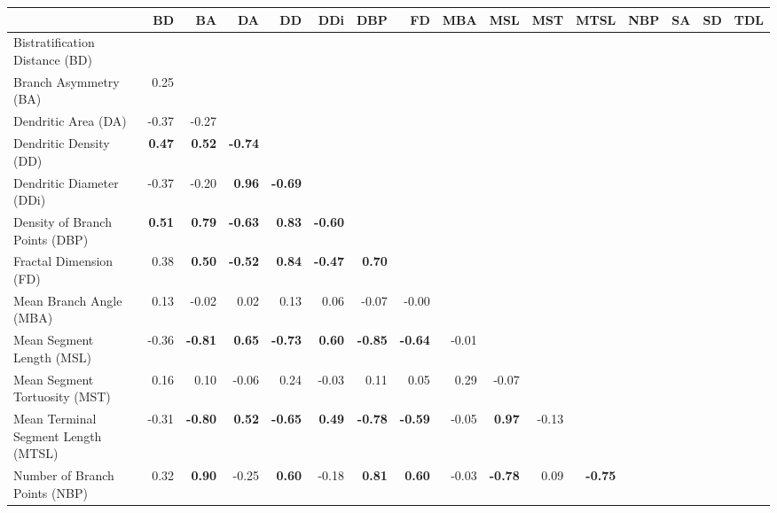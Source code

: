 \documentclass[11pt]{article}
\begin{document}
\clearpage




\begin{sidewaystable}
\begin{tabular}{lrrrrrrrrrrrrrrr}
\toprule
& BD& BA& DA& DD& DDi& DBP& FD& MBA& MSL& MST& MTSL& NBP& SA& SD& TDL\\
\midrule
Bistratification Distance (BD) & \textbf{}  &  &  &  &  &  &  &  &  &  &  &  &  &  & \\
Branch Asymmetry (BA) & 0.25 & \textbf{}  &  &  &  &  &  &  &  &  &  &  &  &  & \\
Dendritic Area (DA) & -0.37 & -0.27 & \textbf{}  &  &  &  &  &  &  &  &  &  &  &  & \\
Dendritic Density (DD) & \textbf{0.47} & \textbf{0.52} & \textbf{-0.74} & \textbf{}  &  &  &  &  &  &  &  &  &  &  & \\
Dendritic Diameter (DDi) & -0.37 & -0.20 & \textbf{0.96} & \textbf{-0.69} & \textbf{}  &  &  &  &  &  &  &  &  &  & \\
Density of Branch Points (DBP) & \textbf{0.51} & \textbf{0.79} & \textbf{-0.63} & \textbf{0.83} & \textbf{-0.60} & \textbf{}  &  &  &  &  &  &  &  &  & \\
Fractal Dimension (FD) & 0.38 & \textbf{0.50} & \textbf{-0.52} & \textbf{0.84} & \textbf{-0.47} & \textbf{0.70} & \textbf{}  &  &  &  &  &  &  &  & \\
Mean Branch Angle (MBA) & 0.13 & -0.02 & 0.02 & 0.13 & 0.06 & -0.07 & -0.00 & \textbf{}  &  &  &  &  &  &  & \\
Mean Segment Length (MSL) & -0.36 & \textbf{-0.81} & \textbf{0.65} & \textbf{-0.73} & \textbf{0.60} & \textbf{-0.85} & \textbf{-0.64} & -0.01 & \textbf{}  &  &  &  &  &  & \\
Mean Segment Tortuosity (MST) & 0.16 & 0.10 & -0.06 & 0.24 & -0.03 & 0.11 & 0.05 & 0.29 & -0.07 & \textbf{}  &  &  &  &  & \\
Mean Terminal Segment Length (MTSL) & -0.31 & \textbf{-0.80} & \textbf{0.52} & \textbf{-0.65} & \textbf{0.49} & \textbf{-0.78} & \textbf{-0.59} & -0.05 & \textbf{0.97} & -0.13 & \textbf{}  &  &  &  & \\
Number of Branch Points (NBP) & 0.32 & \textbf{0.90} & -0.25 & \textbf{0.60} & -0.18 & \textbf{0.81} & \textbf{0.60} & -0.03 & \textbf{-0.78} & 0.09 & \textbf{-0.75} & \textbf{}  &  &  & \\

\end{tabular}
\end{sidewaystable}
\end{document}

